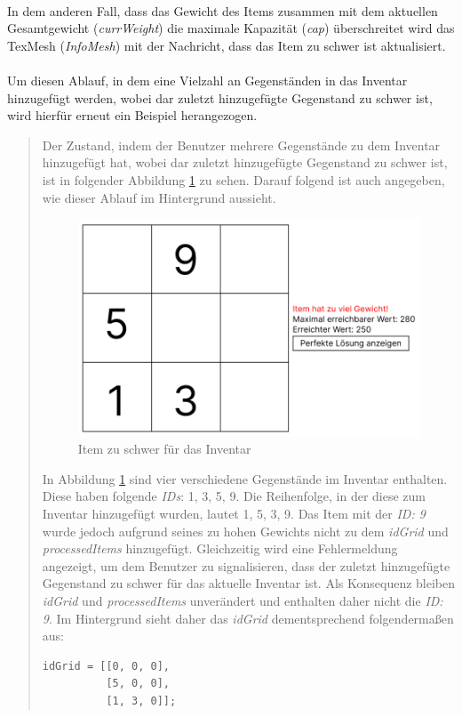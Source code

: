 \\
In dem anderen Fall, dass das Gewicht des Items zusammen mit dem aktuellen Gesamtgewicht (\textit{currWeight}) die maximale
Kapazität (\textit{cap}) überschreitet wird das TexMesh (\textit{InfoMesh}) mit der Nachricht, dass das Item zu schwer
ist aktualisiert.\\
\\
Um diesen Ablauf, in dem eine Vielzahl an Gegenständen in das Inventar hinzugefügt werden, wobei dar zuletzt hinzugefügte
Gegenstand zu schwer ist, wird hierfür erneut ein Beispiel herangezogen.

\begin{quote}
Der Zustand, indem der Benutzer mehrere Gegenstände zu dem Inventar hinzugefügt hat, wobei dar zuletzt hinzugefügte
Gegenstand zu schwer ist, ist in folgender Abbildung \ref{fig:controller_itemToHeavy} zu sehen. Darauf folgend ist auch
angegeben, wie dieser Ablauf im Hintergrund aussieht.

\begin{figure}[h]
\centering
\includegraphics[scale=0.6]{images/itemToHeavy}
\caption{Item zu schwer für das Inventar}
\label{fig:controller_itemToHeavy}
\end{figure}

In Abbildung \ref{fig:controller_itemToHeavy} sind vier verschiedene Gegenstände im Inventar enthalten. Diese haben
folgende \textit{IDs}: 1, 3, 5, 9. Die Reihenfolge, in der diese zum Inventar hinzugefügt wurden, lautet 1, 5, 3, 9. Das
Item mit der \textit{ID: 9} wurde jedoch aufgrund seines zu hohen Gewichts nicht zu dem \textit{idGrid} und
\textit{processedItems} hinzugefügt. Gleichzeitig wird eine Fehlermeldung angezeigt, um dem Benutzer zu signalisieren,
dass der zuletzt hinzugefügte Gegenstand zu schwer für das aktuelle Inventar ist. Als Konsequenz bleiben \textit{idGrid}
und \textit{processedItems} unverändert und enthalten daher nicht die \textit{ID: 9}. Im Hintergrund sieht daher das
\textit{idGrid} dementsprechend folgendermaßen aus:
\begin{lstlisting}[style=csharp label=code:controller_savedIDs]
idGrid = [[0, 0, 0],
          [5, 0, 0],
          [1, 3, 0]];
\end{lstlisting}


\end{quote}
